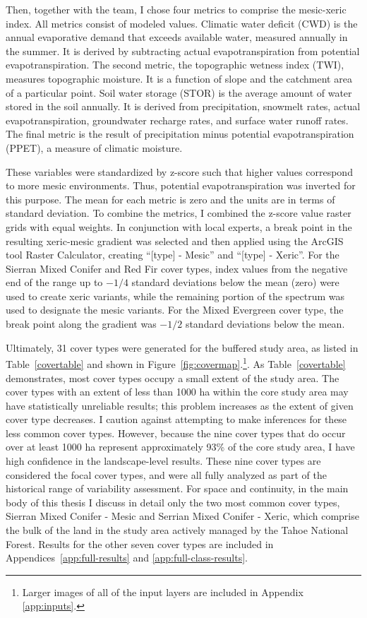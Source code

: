 Then, together with the team, I chose four metrics to comprise the mesic-xeric index. All metrics consist of modeled values. Climatic water deficit (CWD) is the annual evaporative demand that exceeds available water, measured annually in the summer. It is derived by subtracting actual evapotranspiration from potential evapotranspiration. The second metric, the topographic wetness index (TWI), measures topographic moisture. It is a function of slope and the catchment area of a particular point. Soil water storage (STOR) is the average amount of water stored in the soil annually. It is derived from precipitation, snowmelt rates, actual evapotranspiration, groundwater recharge rates, and surface water runoff rates. The final metric is the result of precipitation minus potential evapotranspiration (PPET), a measure of climatic moisture.

These variables were standardized by z-score such that higher values correspond to more mesic environments. Thus, potential evapotranspiration was inverted for this purpose. The mean for each metric is zero and the units are in terms of standard deviation. To combine the metrics, I combined the z-score value raster grids with equal weights. In conjunction with local experts, a break point in the resulting xeric-mesic gradient was selected and then applied using the ArcGIS tool Raster Calculator, creating ``[type] - Mesic'' and ``[type] - Xeric''. For the Sierran Mixed Conifer and Red Fir cover types, index values from the negative end of the range up to $-1/4$ standard deviations below the mean (zero) were used to create xeric variants, while the remaining portion of the spectrum was used to designate the mesic variants. For the Mixed Evergreen cover type, the break point along the gradient was $-1/2$ standard deviations below the mean. 


Ultimately, 31 cover types were generated for the buffered study area, as listed in Table~\ref{covertable} and shown in Figure~\ref{fig:covermap}.\footnote{Larger images of all of the input layers are included in Appendix \ref{app:inputs}.}. %
As Table~\ref{covertable} demonstrates, most cover types occupy a small extent of the study area. The cover types with an extent of less than 1000 ha within the core study area may have statistically unreliable results; this problem increases as the extent of given cover type decreases. I caution against attempting to make inferences for these less common cover types. However, because the nine cover types that do occur over at least 1000 ha represent approximately 93\% of the core study area, I have high confidence in the landscape-level results. These nine cover types are considered the focal cover types, and were all fully analyzed as part of the historical range of variability assessment. For space and continuity, in the main body of this thesis I discuss in detail only the two most common cover types, Sierran Mixed Conifer - Mesic and Serrian Mixed Conifer - Xeric, which comprise the bulk of the land in the study area actively managed by the Tahoe National Forest. Results for the other seven cover types are included in Appendices~\ref{app:full-results} and \ref{app:full-class-results}. 


